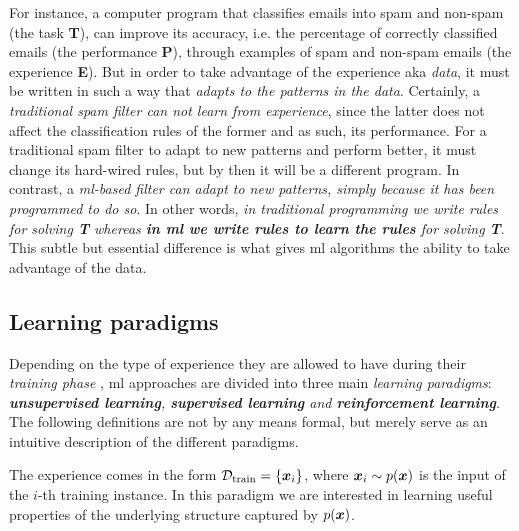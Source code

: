 For instance, a computer program that
classifies emails into spam and non-spam (the task \textbf{T}), can improve its
accuracy, i.e. the percentage of correctly classified emails (the performance
\textbf{P}), through examples of spam and non-spam emails (the experience
\textbf{E}). But in order to take advantage of the experience aka
\emph{data}, it must be written in such a way that \emph{adapts to
the patterns in the data}. Certainly, a \emph{traditional spam filter can not
learn from experience}, since the latter does not affect the classification
rules of the former and as such, its performance. For a traditional spam filter
to adapt to new patterns and perform better, it must change its hard-wired
rules, but by then it will be a different program. In contrast, a
\emph{\gls{ml}-based filter can adapt to new patterns, simply because it has
been programmed to do so}. In other words, \emph{in traditional
programming we write rules for solving \textbf{T}
whereas \textbf{in \gls{ml} we write rules to learn the rules} for solving
\textbf{T}}. This subtle but essential difference is what gives \gls{ml}
algorithms the ability to take advantage of the data.

\subsection{Learning paradigms}

Depending on the type of experience they are allowed to have during their
\emph{training phase} \parencite{deeplearning}, \gls{ml} approaches are divided
into three main \emph{learning paradigms}:
\emph{\textbf{unsupervised learning}, \textbf{supervised learning} and \textbf{reinforcement learning}}. The following definitions are not by any
means formal, but merely serve as an intuitive description of the different
paradigms.

\begin{definition}[name=Unsupervised learning]
	The experience comes in the form $\mathcal{D}_\text{train} = \{\boldsymbol{x}_i\}$, where $\boldsymbol{x}_i \sim
	p(\boldsymbol{x})$ is the input of the $i$-th training instance. In this paradigm we are interested in learning useful properties
	of the underlying structure captured by $p(\boldsymbol{x})$.
\end{definition}

